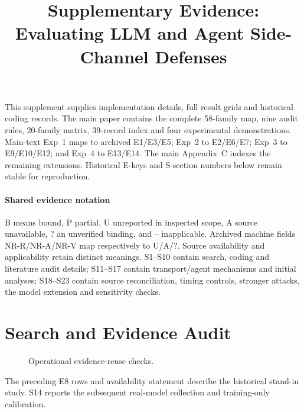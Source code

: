 \documentclass[conference,compsoc]{IEEEtran}
\title{Supplementary Evidence: Evaluating LLM and Agent Side-Channel Defenses}
\author{}
\begin{document}
\maketitle
This supplement supplies implementation details, full result grids and historical coding records. The main paper contains the complete 58-family map, nine audit rules, 20-family matrix, 39-record index and four experimental demonstrations. Main-text Exp~1 maps to archived E1/E3/E5; Exp~2 to E2/E6/E7; Exp~3 to E9/E10/E12; and Exp~4 to E13/E14. The main Appendix~C indexes the remaining extensions. Historical E-keys and S-section numbers below remain stable for reproduction.

\paragraph{Shared evidence notation}
B means bound, P partial, U unreported in inspected scope, A source unavailable, ? an unverified binding, and -- inapplicable. Archived machine fields NR-R/NR-A/NR-V map respectively to U/A/?. Source availability and applicability retain distinct meanings. S1--S10 contain search, coding and literature audit details; S11--S17 contain transport/agent mechanisms and initial analyses; S18--S23 contain source reconciliation, timing controls, stronger attacks, the model extension and sensitivity checks.
\section{Search and Evidence Audit}\label{app:search}





















\begin{figure}[t]\centering\caption{Operational evidence-reuse checks.}\label{fig:defense-decision}\end{figure}
\clearpage
\onecolumn




\clearpage

\par\noindent The preceding E8 rows and availability statement describe the historical stand-in study. S14 reports the subsequent real-model collection and training-only calibration.\par
\clearpage

\end{document}

